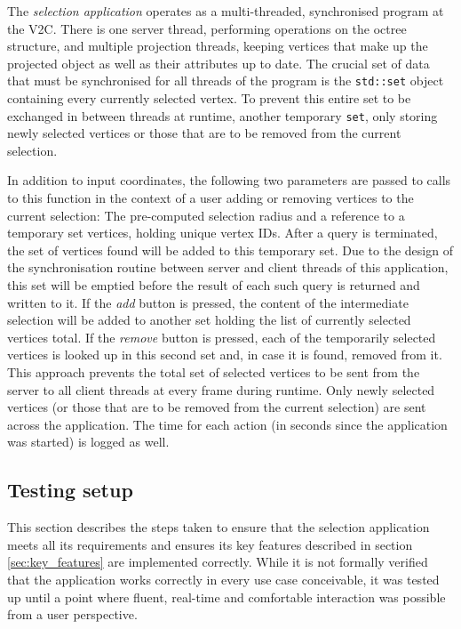 The \textit{selection application} operates as a multi-threaded, synchronised program at the V2C. There is one server thread, performing operations on the octree structure, and multiple projection threads, keeping vertices that make up the projected object as well as their attributes up to date. The crucial set of data that must be synchronised for all threads of the program is the \texttt{std::set} object containing every currently selected vertex. To prevent this entire set to be exchanged in between threads at runtime, another temporary \texttt{set}, only storing newly selected vertices or those that are to be removed from the current selection.

In addition to input coordinates, the following two parameters are passed to calls to this function in the context of a user adding or removing vertices to the current selection: The pre-computed selection radius and a reference to a temporary set vertices, holding unique vertex IDs. After a query is terminated, the set of vertices found will be added to this temporary set. Due to the design of the synchronisation routine between server and client threads of this application, this set will be emptied before the result of each such query is returned and written to it. If the \textit{add} button is pressed, the content of the intermediate selection will be added to another set holding the list of currently selected vertices total. If the \textit{remove} button is pressed, each of the temporarily selected vertices is looked up in this second set and, in case it is found, removed from it. This approach prevents the total set of selected vertices to be sent from the server to all client threads at every frame during runtime. Only newly selected vertices (or those that are to be removed from the current selection) are sent across the application. The time for each action (in seconds since the application was started) is logged as well.

\subsection{Testing setup}
\label{sec:testing_setup}

This section describes the steps taken to ensure that the selection application meets all its requirements and ensures its key features described in section \ref{sec:key_features} are implemented correctly. While it is not formally verified that the application works correctly in every use case conceivable, it was tested up until a point where fluent, real-time and comfortable interaction was possible from a user perspective.

